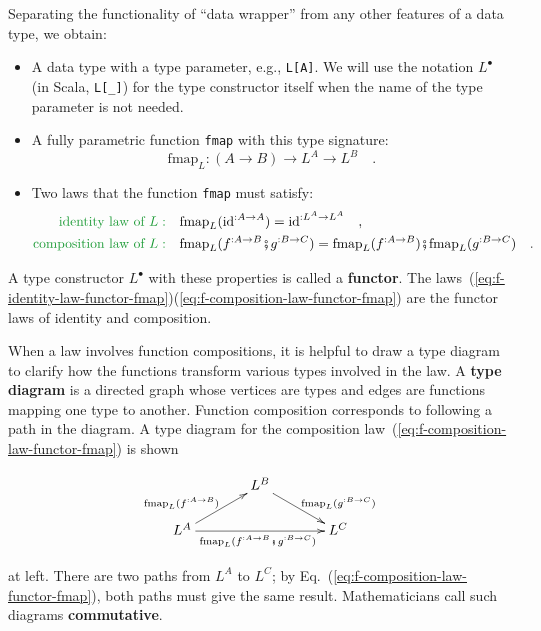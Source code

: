 Separating the functionality of \textsf{``}data wrapper\textsf{''} from any other
features of a data type, we obtain:
\begin{itemize}
\item A data type with a type parameter, e.g., \lstinline!L[A]!. We will
use the notation $L^{\bullet}$ (in Scala, \lstinline!L[_]!) for
the type constructor itself when the name of the type parameter is
not needed.
\item A fully parametric function \lstinline!fmap!
with this type signature:
\[
\text{fmap}_{L}:\left(A\rightarrow B\right)\rightarrow L^{A}\rightarrow L^{B}\quad.
\]
\item Two laws that the function \lstinline!fmap! must satisfy:
\begin{align}
{\color{greenunder}\text{identity law of }L:}\quad & \text{fmap}_{L}(\text{id}^{:A\rightarrow A})=\text{id}^{:L^{A}\rightarrow L^{A}}\quad,\label{eq:f-identity-law-functor-fmap}\\
{\color{greenunder}\text{composition law of }L:}\quad & \text{fmap}_{L}(f^{:A\rightarrow B}\bef g^{:B\rightarrow C})=\text{fmap}_{L}(f^{:A\rightarrow B})\bef\text{fmap}_{L}(g^{:B\rightarrow C})\quad.\label{eq:f-composition-law-functor-fmap}
\end{align}
\end{itemize}
A type constructor $L^{\bullet}$ with these properties is called
a \textbf{functor}. The laws~(\ref{eq:f-identity-law-functor-fmap})\textendash (\ref{eq:f-composition-law-functor-fmap})
are the functor laws of identity and composition. 

When a law involves function compositions, it is helpful to draw a
type diagram to clarify how the functions transform
various types involved in the law. A \textbf{type diagram}
is a directed graph whose vertices are types and edges are functions
mapping one type to another. Function composition corresponds to following
a path in the diagram. A type diagram for the composition law~(\ref{eq:f-composition-law-functor-fmap})
is shown\begin{wrapfigure}{l}{0.4\columnwidth}%
\vspace{-1.9\baselineskip}
\[
\xymatrix{\xyScaleY{1.5pc}\xyScaleX{3pc} & L^{B}\ar[rd]\sp(0.6){~~\text{fmap}_{L}(g^{:B\rightarrow C})}\\
L^{A}\ar[ru]\sp(0.4){\text{fmap}_{L}(f^{:A\rightarrow B})\ ~}\ar[rr]\sb(0.5){\text{fmap}_{L}(f^{:A\rightarrow B}\bef g^{:B\rightarrow C})\ } &  & L^{C}
}
\]

\vspace{-2\baselineskip}
\end{wrapfigure}%
at left. There are two paths from $L^{A}$ to $L^{C}$; by Eq.~(\ref{eq:f-composition-law-functor-fmap}),
both paths must give the same result. Mathematicians call such diagrams
\textbf{commutative}.


